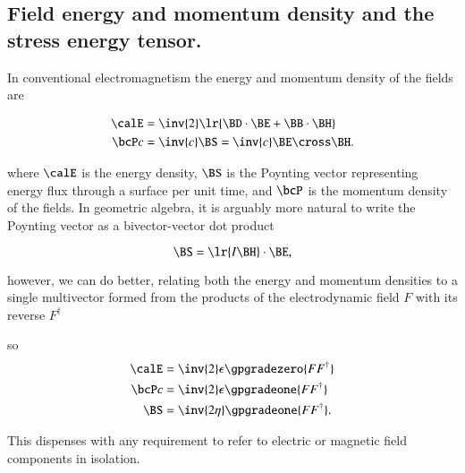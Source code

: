 %
%
\subsection{Field energy and momentum density and the stress energy tensor.}

In conventional electromagnetism the energy and momentum density of the fields are

\begin{dmath}\label{eqn:poyntingF:20}
\begin{aligned}
\calE &= \inv{2} \lr{ \BD \cdot \BE + \BB \cdot \BH } \\
\bcP c &= \inv{c} \BS = \inv{c} \BE \cross \BH.
\end{aligned}
\end{dmath}

where \( \calE \) is the energy density, \( \BS \) is the Poynting vector representing energy flux through a surface per unit time, and \( \bcP \) is the momentum density of the fields.
In geometric algebra, it is arguably more natural to write the Poynting vector as a bivector-vector dot product

\begin{dmath}\label{eqn:poyntingF:1100}
\BS = \lr{ I \BH } \cdot \BE,
\end{dmath}

however, we can do better, relating both the
energy and momentum densities to a single multivector formed from the products of the electrodynamic field \( F \) with its reverse \( F^\dagger \)


so
\begin{dmath}\label{eqn:poyntingF:40}
\begin{aligned}
\calE &= \inv{2} \epsilon \gpgradezero{ F F^\dagger } \\
\bcP c &= \inv{2} \epsilon \gpgradeone{ F F^\dagger } \\
\BS &= \inv{2 \eta} \gpgradeone{ F F^\dagger }.
\end{aligned}
\end{dmath}

This dispenses with any requirement to refer to electric or magnetic field components in isolation.

